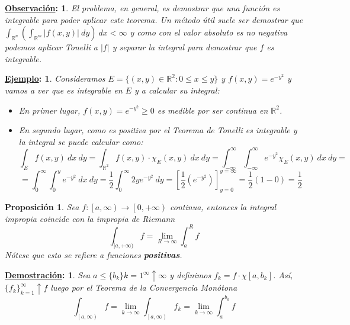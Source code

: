 \documentclass[10pt,a4paper,openright]{book}
\theoremstyle{break}
\newtheorem*{prop}{Proposición}
\newtheorem*{demo}{\underline{Demostración}:}
\newtheorem*{obs}{\underline{Observación}:}
\newtheorem*{ej}{\underline{Ejemplo}:}
\newcommand{\dif}[1]{\ d#1}
\begin{document}
\begin{obs}
El problema, en general, es demostrar que una función es integrable para poder aplicar este teorema. Un método útil suele ser demostrar que $\int_{\mathbb{R}^n} \left(\int_{\mathbb{R}^m} \vert f \left(x, y\right) \vert \dif{y} \right) \dif{x} < \infty$ y como con el valor absoluto es no negativa podemos aplicar Tonelli a $\vert f\vert$ y separar la integral para demostrar que $f$ es integrable.
\end{obs}

\begin{ej}
Consideramos $E = \{ \left(x, y\right) \in \mathbb{R}^2 : 0 \leq x \leq y\}$ y $f \left(x, y\right) = e^{-y^2}$ y vamos a ver que es integrable en $E$ y a calcular su integral:
\begin{itemize}
    \item En primer lugar, $f \left(x, y\right) = e^{-y^2} \ge 0$ es medible por ser continua en $\mathbb{R}^2$.
    \item En segundo lugar, como es positiva por el Teorema de Tonelli es integrable y la integral se puede calcular como: 
    $$\int_E f \left(x, y\right) \dif{x} \dif{y} = \int_{\mathbb{R}^2} f \left(x, y\right) \cdot \chi_{E} \left(x, y\right) \dif{x} \dif{y} = \int_{-\infty}^{\infty} \int_{-\infty}^{\infty} e^{-y^2}\chi_E \left(x, y\right) \dif{x} \dif{y} =$$
    $$=\int_{0}^{\infty} \int_{0}^{y} e^{-y^2} \dif{x} \dif{y} = \frac{1}{2} \int_{0}^{\infty} 2ye^{-y^2} \dif{y} = \left[\frac{1}{2} \left(e^{-y^2}\right)\right]_{y=0}^{y=\infty} = \frac{1}{2} \left(1 - 0\right) =\frac{1}{2}$$
\end{itemize}
\end{ej}

\begin{prop}
Sea $f: \left[a, \infty\right) \rightarrow \left[0, +\infty\right)$ continua, entonces la integral impropia coincide con la impropia de Riemann
$$\int_{[a, +\infty)} f = \lim_{R \rightarrow \infty} \int_a^R f $$
Nótese que esto se refiere a funciones \textbf{positivas}.
\end{prop}
\begin{demo}
Sea $a \le \{b_k\}{k=1}^{\infty}\uparrow \infty$ y definimos $f_k = f \cdot \chi{\left[a, b_k\right]}$. Así, $\{f_k\}_{k=1}^{\infty}\uparrow f$ luego por el Teorema de la Convergencia Monótona
$$\int_{\left[a, \infty\right)} f = \lim_{k \rightarrow \infty} \int_{\left[a, \infty\right)} f_k = \lim_{k \rightarrow \infty} \int_a^{b_k} f $$
\end{demo}
\end{document}
